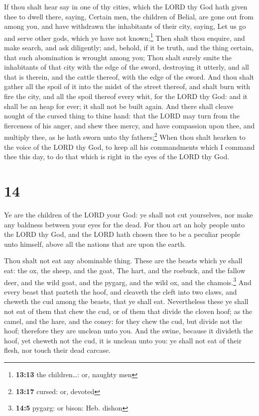  If thou shalt hear say in one of thy cities, which the
LORD thy God hath given thee to dwell there, saying, 
Certain men, the children of Belial, are gone out from among you, and
have withdrawn the inhabitants of their city, saying, Let us go and
serve other gods, which ye have not known;\footnote{\textbf{13:13} the
  children\ldots: or, naughty men}  Then shalt thou
enquire, and make search, and ask diligently; and, behold, if it be
truth, and the thing certain, that such abomination is wrought among
you;  Thou shalt surely smite the inhabitants of that
city with the edge of the sword, destroying it utterly, and all that is
therein, and the cattle thereof, with the edge of the sword.
 And thou shalt gather all the spoil of it into the midst
of the street thereof, and shalt burn with fire the city, and all the
spoil thereof every whit, for the LORD thy God: and it shall be an heap
for ever; it shall not be built again.  And there shall
cleave nought of the cursed thing to thine hand: that the LORD may turn
from the fierceness of his anger, and shew thee mercy, and have
compassion upon thee, and multiply thee, as he hath sworn unto thy
fathers;\footnote{\textbf{13:17} cursed: or, devoted} 
When thou shalt hearken to the voice of the LORD thy God, to keep all
his commandments which I command thee this day, to do that which is
right in the eyes of the LORD thy God.

\hypertarget{section-13}{%
\section{14}\label{section-13}}

 Ye are the children of the LORD your God: ye shall not
cut yourselves, nor make any baldness between your eyes for the dead.
 For thou art an holy people unto the LORD thy God, and
the LORD hath chosen thee to be a peculiar people unto himself, above
all the nations that are upon the earth.

 Thou shalt not eat any abominable thing. 
These are the beasts which ye shall eat: the ox, the sheep, and the
goat,  The hart, and the roebuck, and the fallow deer, and
the wild goat, and the pygarg, and the wild ox, and the
chamois.\footnote{\textbf{14:5} pygarg: or bison: Heb. dishon}
 And every beast that parteth the hoof, and cleaveth the
cleft into two claws, and cheweth the cud among the beasts, that ye
shall eat.  Nevertheless these ye shall not eat of them
that chew the cud, or of them that divide the cloven hoof; as the camel,
and the hare, and the coney: for they chew the cud, but divide not the
hoof; therefore they are unclean unto you.  And the swine,
because it divideth the hoof, yet cheweth not the cud, it is unclean
unto you: ye shall not eat of their flesh, nor touch their dead carcase.

